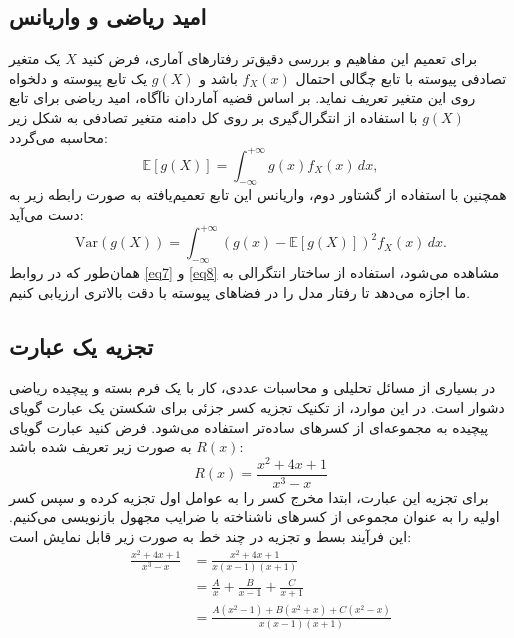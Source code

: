 \subsection{امید ریاضی و واریانس}\label{subsec:2-1-3}
برای تعمیم این مفاهیم و بررسی دقیق‌تر رفتارهای آماری، فرض کنید $ X $ یک متغیر تصادفی پیوسته با تابع چگالی احتمال
 $ f_X(x) $ باشد و $ g(X) $ یک تابع پیوسته و دلخواه روی این متغیر تعریف نماید. بر اساس قضیه آماردان ناآگاه، امید ریاضی برای تابع $ g(X) $ با استفاده از انتگرال‌گیری بر روی کل دامنه متغیر تصادفی به شکل زیر محاسبه می‌گردد:
\begin{equation}
	\label{eq7}
	\mathbb{E}[g(X)] = \int_{-\infty}^{+\infty} g(x) f_X(x) \, dx,
\end{equation}
همچنین با استفاده از گشتاور دوم، واریانس این تابع تعمیم‌یافته به صورت رابطه زیر به دست می‌آید:
\begin{equation}
	\label{eq8}
	\mathrm{Var}(g(X)) = \int_{-\infty}^{+\infty} \left( g(x) - \mathbb{E}[g(X)] \right)^2 f_X(x) \, dx.
\end{equation}
همان‌طور که در روابط \eqref{eq7} و \eqref{eq8} مشاهده می‌شود، استفاده از ساختار انتگرالی به ما اجازه می‌دهد تا رفتار مدل را در فضاهای پیوسته با دقت بالاتری ارزیابی کنیم.
\subsection{تجزیه یک عبارت}\label{subsec:2-1-4}
در بسیاری از مسائل تحلیلی و محاسبات عددی، کار با یک فرم بسته و پیچیده ریاضی دشوار است. در این موارد، از تکنیک تجزیه کسر جزئی برای شکستن یک عبارت گویای پیچیده به مجموعه‌ای از کسرهای ساده‌تر استفاده می‌شود. فرض کنید عبارت گویای $ R(x) $ به صورت زیر تعریف شده باشد:
\begin{equation}
	\label{eq9}
	R(x) = \frac{x^2 + 4x + 1}{x^3 - x}
\end{equation}
برای تجزیه این عبارت، ابتدا مخرج کسر را به عوامل اول تجزیه کرده و سپس کسر اولیه را به عنوان مجموعی از کسرهای ناشناخته با ضرایب مجهول بازنویسی می‌کنیم. این فرآیند بسط و تجزیه در چند خط به صورت زیر قابل نمایش است:
\begin{align}
	\frac{x^2 + 4x + 1}{x^3 - x} &= \frac{x^2 + 4x + 1}{x(x - 1)(x + 1)} \nonumber \\
	&= \frac{A}{x} + \frac{B}{x - 1} + \frac{C}{x + 1} \nonumber \\
	&= \frac{A(x^2 - 1) + B(x^2 + x) + C(x^2 - x)}{x(x - 1)(x + 1)} \label{eq10}
\end{align}


